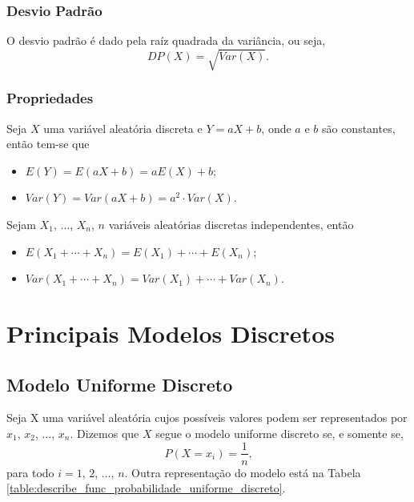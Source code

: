 \documentclass[11pt,fleqn]{book}
\numberwithin{mpicture}{chapter}
\numberwithin{mtable}{chapter}
\numberwithin{mframe}{chapter}
\begin{document}
\subsubsection*{Desvio Padrão}

O desvio padrão é dado pela raíz quadrada da variância, ou seja,
\begin{equation}
	DP(X)=\sqrt{Var(X)}\text{.}
\end{equation}


\subsubsection*{Propriedades}

\begin{theorem}
	Seja $X$ uma variável aleatória discreta e $Y=aX+b$, onde $a$ e $b$ são constantes, então tem-se que
	\begin{itemize}
		\item $E(Y)=E(aX+b)=aE(X)+b$;
		\item $Var(Y)=Var(aX+b)=a^2\cdot Var(X)$.
	\end{itemize}
\end{theorem}

\begin{theorem}
	Sejam $X_1$, $\dots$, $X_n$, $n$ variáveis aleatórias discretas independentes, então
	\begin{itemize}
		\item $E(X_1 + \cdots + X_n)=E(X_1) + \cdots + E(X_n)$;
		\item $Var(X_1 + \cdots + X_n)=Var(X_1) + \cdots + Var(X_n)$.
	\end{itemize}
\end{theorem}

\section{Principais Modelos Discretos}

\subsection{Modelo Uniforme Discreto}

Seja X uma variável aleatória cujos possíveis valores podem ser representados por $x_1$, $x_2$, $\dots$, $x_n$. Dizemos que $X$ segue o modelo uniforme discreto se, e somente se,
\begin{equation}
	P(X=x_i)=\frac{1}{n}\text{,}
\end{equation}
para todo $i=1$, $2$, $\dots$, $n$. Outra representação do modelo está na Tabela \ref{table:describe_func_probabilidade_uniforme_discreto}.
\end{document}
